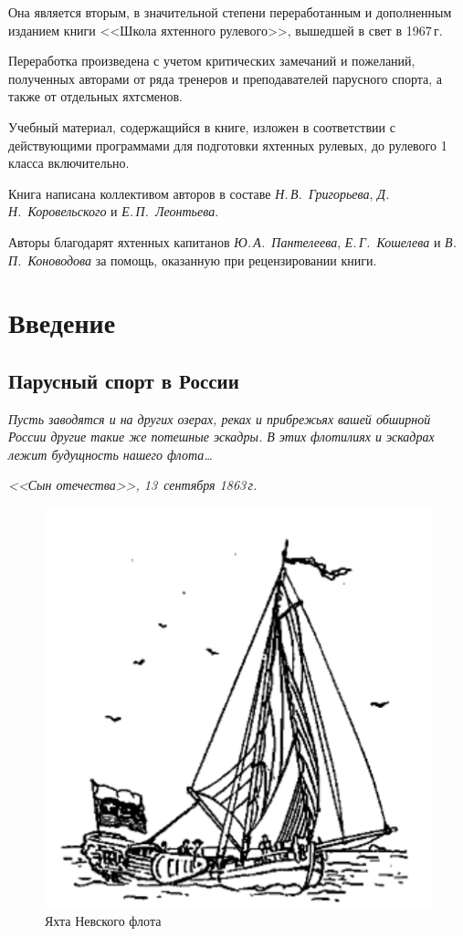 \documentclass[a4paper, 12pt, twoside, final]{scrbook}
\begin{document}
Она является вторым, в значительной степени переработанным и дополненным изданием книги <<Школа яхтенного рулевого>>, вышедшей в свет в 1967\,г. 

Переработка произведена с учетом критических замечаний и пожеланий, полученных авторами от ряда тренеров и преподавателей парусного спорта, а также от отдельных яхтсменов. 

Учебный материал, содержащийся в книге, изложен в соответствии с действующими программами для подготовки яхтенных рулевых, до рулевого 1 класса включительно.

Книга написана коллективом авторов в составе \textit{Н.\,В.~Григорьева}, \textit{Д.\,Н.~Коровельского} и \textit{Е.\,П.~Ле\-онтьева}.

Авторы благодарят яхтенных капитанов \textit{Ю.\,А.~Пантелеева},  \textit{Е.\,Г.~Кошелева} и  \textit{В.\,П.~Коноводова} за помощь, оказанную при рецензировании книги.

\mainmatter

\chapter{Введение}
\section{Парусный спорт в России}

\epigraph{\emph{Пусть заводятся и на других озерах, реках и прибрежьях вашей обширной России другие такие же потешные эскадры. В этих флотилиях и эскадрах лежит будущность нашего флота\ldots}}{\emph{<<Сын отечества>>, 13~сентября 1863\,г.}}

\begin{figure}
\centering
\includegraphics{pics/Yahta_Nevskogo_flota}
\caption{Яхта Невского флота}
\end{figure}
\end{document}
